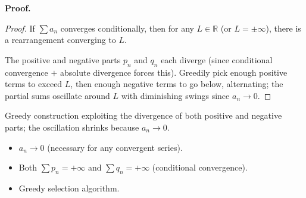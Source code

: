 \noindent
\textbf{Proof.}
\begin{proof}
\Claim If $\sum a_n$ converges conditionally, then for any $L \in \mathbb{R}$ (or $L = \pm\infty$), there is a rearrangement converging to $L$.

\Given 

\Goal 

\Strategy The positive and negative parts $p_n$ and $q_n$ each diverge (since conditional convergence $+$ absolute divergence forces this). Greedily pick enough positive terms to exceed $L$, then enough negative terms to go below, alternating; the partial sums oscillate around $L$ with diminishing swings since $a_n \to 0$.

\medskip


\end{proof}

\begin{remark*}
Greedy construction exploiting the divergence of both positive and negative parts; the oscillation shrinks because $a_n \to 0$.
\end{remark*}

\begin{remark*}[Dependencies]
\begin{itemize}
  \item $a_n \to 0$ (necessary for any convergent series).
  \item Both $\sum p_n = +\infty$ and $\sum q_n = +\infty$ (conditional convergence).
  \item Greedy selection algorithm.
\end{itemize}
\end{remark*}
